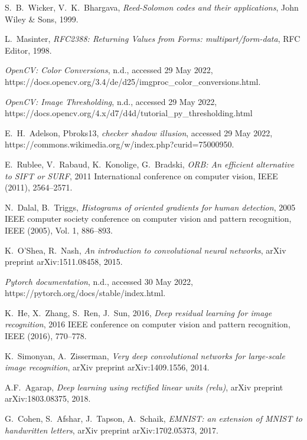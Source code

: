 \documentclass[11pt, a4paper]{report}
\begin{document}
\begin{thebibliography}{99}	

S.~B.~Wicker, V.~K.~Bhargava,
\emph{Reed-Solomon codes and their applications},
John Wiley \& Sons, 1999.

L.~Masinter, 
\emph{RFC2388: Returning Values from Forms: multipart/form-data},
RFC Editor, 1998.

\emph{OpenCV: Color Conversions}, n.d., accessed 29 May 2022,  https://docs.opencv.org/3.4/de/d25/imgproc\_color\_conversions.html.

\emph{OpenCV: Image Thresholding}, n.d., accessed 29 May 2022,
https://docs.opencv.org/4.x/d7/d4d/tutorial\_py\_thresholding.html

E.~H.~Adelson, Pbroks13, \emph{checker shadow illusion}, accessed 29 May 2022, https://commons.wikimedia.org/w/index.php?curid=75000950.

E.~Rublee, V.~Rabaud, K.~Konolige, G.~Bradski,
\emph{ORB: An efficient alternative to SIFT or SURF},
	2011 International conference on computer vision, IEEE (2011),
	2564--2571.

N.~Dalal, B.~Triggs,
\emph{Histograms of oriented gradients for human detection},
2005 IEEE computer society conference on computer vision and pattern recognition, IEEE (2005), Vol. 1, 886--893.

K.~O'Shea, R.~Nash,
\emph{An introduction to convolutional neural networks}, arXiv preprint
arXiv:1511.08458, 2015.

\emph{Pytorch documentation}, n.d., accessed 30 May 2022,
https://pytorch.org/docs/stable/index.html.

K.~He, X.~Zhang, S.~Ren, J.~Sun, 2016,
\emph{Deep residual learning for image recognition},
2016 IEEE conference on computer vision and pattern recognition, IEEE (2016), 770--778.

K.~Simonyan, A.~Zisserman,
\emph{Very deep convolutional networks for large-scale image recognition}, arXiv preprint arXiv:1409.1556, 2014.

A.F.~Agarap,
\emph{Deep learning using rectified linear units (relu)}, arXiv preprint arXiv:1803.08375, 2018.

G.~Cohen, S.~Afshar, J.~Tapson, A.~Schaik,
\emph{EMNIST: an extension of MNIST to handwritten letters}, arXiv preprint arXiv:1702.05373, 2017.


\end{thebibliography}
\end{document}
